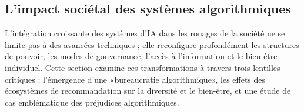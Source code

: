 \subsection{L'impact sociétal des systèmes algorithmiques}

L'intégration croissante des systèmes d'IA dans les rouages de la société ne se limite pas à des avancées techniques ; elle reconfigure profondément les structures de pouvoir, les modes de gouvernance, l'accès à l'information et le bien-être individuel. Cette section examine ces transformations à travers trois lentilles critiques : l'émergence d'une «bureaucratie algorithmique», les effets des écosystèmes de recommandation sur la diversité et le bien-être, et une étude de cas emblématique des préjudices algorithmiques.
